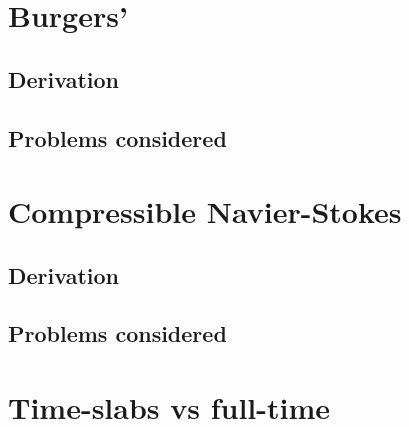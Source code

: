 \documentclass[Proposal.tex]{subfiles}
\begin{document}
\section{Burgers'}

\subsection{Derivation}

\subsection{Problems considered}

\section{Compressible Navier-Stokes}

\subsection{Derivation}

\subsection{Problems considered}

\section{Time-slabs vs full-time}
\end{document}
